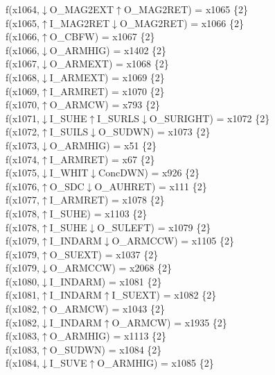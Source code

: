 f(x1064,$\downarrow$O\_MAG2EXT$\uparrow$O\_MAG2RET) = x1065 \{2\} \\  
f(x1065,$\uparrow$I\_MAG2RET$\downarrow$O\_MAG2RET) = x1066 \{2\} \\  
f(x1066,$\uparrow$O\_CBFW) = x1067 \{2\} \\  
f(x1066,$\downarrow$O\_ARMHIG) = x1402 \{2\} \\  
f(x1067,$\downarrow$O\_ARMEXT) = x1068 \{2\} \\  
f(x1068,$\downarrow$I\_ARMEXT) = x1069 \{2\} \\  
f(x1069,$\uparrow$I\_ARMRET) = x1070 \{2\} \\  
f(x1070,$\uparrow$O\_ARMCW) = x793 \{2\} \\  
f(x1071,$\downarrow$I\_SUHE$\uparrow$I\_SURLS$\downarrow$O\_SURIGHT) = x1072 \{2\} \\  
f(x1072,$\uparrow$I\_SUILS$\downarrow$O\_SUDWN) = x1073 \{2\} \\  
f(x1073,$\downarrow$O\_ARMHIG) = x51 \{2\} \\  
f(x1074,$\uparrow$I\_ARMRET) = x67 \{2\} \\  
f(x1075,$\downarrow$I\_WHIT$\downarrow$ConcDWN) = x926 \{2\} \\  
f(x1076,$\uparrow$O\_SDC$\downarrow$O\_AUHRET) = x111 \{2\} \\  
f(x1077,$\uparrow$I\_ARMRET) = x1078 \{2\} \\  
f(x1078,$\uparrow$I\_SUHE) = x1103 \{2\} \\  
f(x1078,$\uparrow$I\_SUHE$\downarrow$O\_SULEFT) = x1079 \{2\} \\  
f(x1079,$\uparrow$I\_INDARM$\downarrow$O\_ARMCCW) = x1105 \{2\} \\  
f(x1079,$\uparrow$O\_SUEXT) = x1037 \{2\} \\  
f(x1079,$\downarrow$O\_ARMCCW) = x2068 \{2\} \\  
f(x1080,$\downarrow$I\_INDARM) = x1081 \{2\} \\  
f(x1081,$\uparrow$I\_INDARM$\uparrow$I\_SUEXT) = x1082 \{2\} \\  
f(x1082,$\uparrow$O\_ARMCW) = x1043 \{2\} \\  
f(x1082,$\downarrow$I\_INDARM$\uparrow$O\_ARMCW) = x1935 \{2\} \\  
f(x1083,$\uparrow$O\_ARMHIG) = x1113 \{2\} \\  
f(x1083,$\uparrow$O\_SUDWN) = x1084 \{2\} \\  
f(x1084,$\downarrow$I\_SUVE$\uparrow$O\_ARMHIG) = x1085 \{2\} \\  
